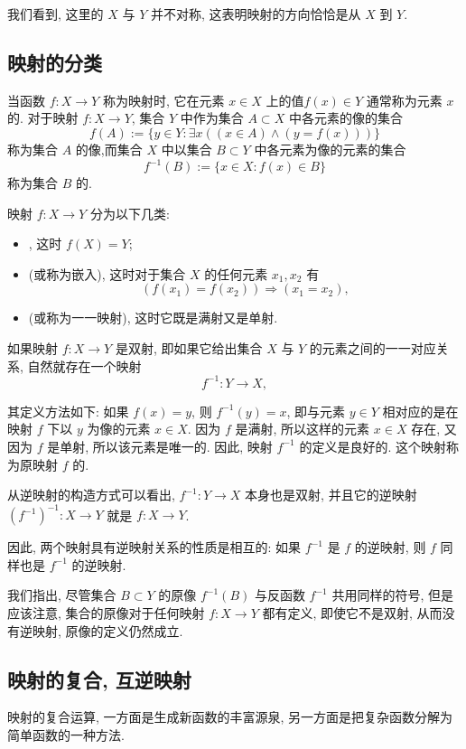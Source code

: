 \documentclass{ctexart}
\begin{document}
我们看到, 这里的 $X$ 与 $Y$ 并不对称, 这表明映射的方向恰恰是从 $X$ 到 $Y$.

\subsection{映射的分类}

当函数 $f: X \rightarrow Y$ 称为映射时, 它在元素 $x \in X$ 上的值$f(x) \in Y$ 通常称为元素 $x$ 的.
对于映射 $f: X \rightarrow Y$, 集合 $Y$ 中作为集合 $A \subset X$ 中各元素的像的集合
$$
f(A):=\{y \in Y : \exists x((x \in A) \wedge(y=f(x)))\}
$$
称为集合 $A$ 的像,而集合 $X$ 中以集合 $B \subset Y$ 中各元素为像的元素的集合
$$
f^{-1}(B):=\{x \in X : f(x) \in B\}
$$
称为集合 $B$ 的.

映射 $f: X \rightarrow Y$ 分为以下几类:
\begin{itemize}
    \item {}, 这时 $f(X)=Y$;
    \item {} (或称为嵌入), 这时对于集合 $X$ 的任何元素 $x_1, x_2$ 有
$$
\left(f\left(x_1\right)=f\left(x_2\right)\right) \Rightarrow\left(x_1=x_2\right),
$$
\item {} (或称为一一映射), 这时它既是满射又是单射.
\end{itemize}

如果映射 $f: X \rightarrow Y$ 是双射, 即如果它给出集合 $X$ 与 $Y$ 的元素之间的一一对应关系, 自然就存在一个映射
$$
f^{-1}: Y \rightarrow X,
$$

其定义方法如下: 如果 $f(x)=y$, 则 $f^{-1}(y)=x$, 即与元素 $y \in Y$ 相对应的是在映射 $f$ 下以 $y$ 为像的元素 $x \in X$. 因为 $f$ 是满射, 所以这样的元素 $x \in X$ 存在, 又因为 $f$ 是单射, 所以该元素是唯一的. 因此, 映射 $f^{-1}$ 的定义是良好的. 这个映射称为原映射 $f$ 的.

从逆映射的构造方式可以看出, $f^{-1}: Y \rightarrow X$ 本身也是双射, 并且它的逆映射 $\left(f^{-1}\right)^{-1}: X \rightarrow Y$ 就是 $f: X \rightarrow Y$.

因此, 两个映射具有逆映射关系的性质是相互的: 如果 $f^{-1}$ 是 $f$ 的逆映射, 则 $f$ 同样也是 $f^{-1}$ 的逆映射.

我们指出, 尽管集合 $B \subset Y$ 的原像 $f^{-1}(B)$ 与反函数 $f^{-1}$ 共用同样的符号, 但是应该注意, 集合的原像对于任何映射 $f: X \rightarrow Y$ 都有定义, 即使它不是双射, 从而没有逆映射, 原像的定义仍然成立.

\subsection{映射的复合, 互逆映射} 映射的复合运算, 一方面是生成新函数的丰富源泉, 另一方面是把复杂函数分解为简单函数的一种方法. 
\end{document}
